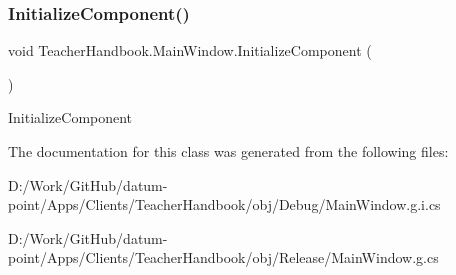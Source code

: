 \subsubsection{\texorpdfstring{Initialize\+Component()}{InitializeComponent()}\hspace{0.1cm}{\footnotesize\ttfamily [5/5]}}
{\footnotesize\ttfamily void Teacher\+Handbook.\+Main\+Window.\+Initialize\+Component (\begin{DoxyParamCaption}{ }\end{DoxyParamCaption})}



Initialize\+Component 



The documentation for this class was generated from the following files\+:\begin{DoxyCompactItemize}
\item 
D\+:/\+Work/\+Git\+Hub/datum-\/point/\+Apps/\+Clients/\+Teacher\+Handbook/obj/\+Debug/Main\+Window.\+g.\+i.\+cs\item 
D\+:/\+Work/\+Git\+Hub/datum-\/point/\+Apps/\+Clients/\+Teacher\+Handbook/obj/\+Release/Main\+Window.\+g.\+cs\end{DoxyCompactItemize}
